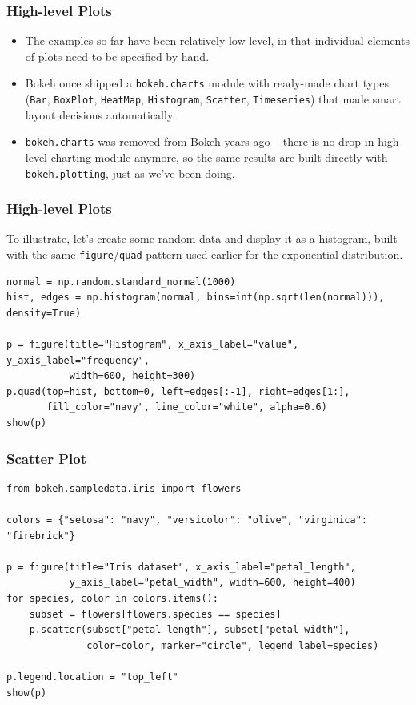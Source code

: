 \begin{frame}[fragile] \frametitle{High-level Plots}
\begin{itemize}
\item The examples so far have been relatively low-level, in that individual elements of plots need to be specified by hand.
\item Bokeh once shipped a \texttt{bokeh.charts} module with ready-made chart types (\texttt{Bar}, \texttt{BoxPlot}, \texttt{HeatMap}, \texttt{Histogram}, \texttt{Scatter}, \texttt{Timeseries}) that made smart layout decisions automatically.
\item \texttt{bokeh.charts} was removed from Bokeh years ago -- there is no drop-in high-level charting module anymore, so the same results are built directly with \texttt{bokeh.plotting}, just as we've been doing.
\end{itemize}
\end{frame}

\begin{frame}[fragile] \frametitle{High-level Plots}
To illustrate, let's create some random data and display it as a histogram, built with the same \texttt{figure}/\texttt{quad} pattern used earlier for the exponential distribution.
\begin{lstlisting}
normal = np.random.standard_normal(1000)
hist, edges = np.histogram(normal, bins=int(np.sqrt(len(normal))), density=True)

p = figure(title="Histogram", x_axis_label="value", y_axis_label="frequency",
           width=600, height=300)
p.quad(top=hist, bottom=0, left=edges[:-1], right=edges[1:],
       fill_color="navy", line_color="white", alpha=0.6)
show(p)
\end{lstlisting}
\end{frame}

\begin{frame}[fragile] \frametitle{Scatter Plot}
\begin{lstlisting}
from bokeh.sampledata.iris import flowers

colors = {"setosa": "navy", "versicolor": "olive", "virginica": "firebrick"}

p = figure(title="Iris dataset", x_axis_label="petal_length",
           y_axis_label="petal_width", width=600, height=400)
for species, color in colors.items():
    subset = flowers[flowers.species == species]
    p.scatter(subset["petal_length"], subset["petal_width"],
              color=color, marker="circle", legend_label=species)

p.legend.location = "top_left"
show(p)
\end{lstlisting}
\end{frame}

